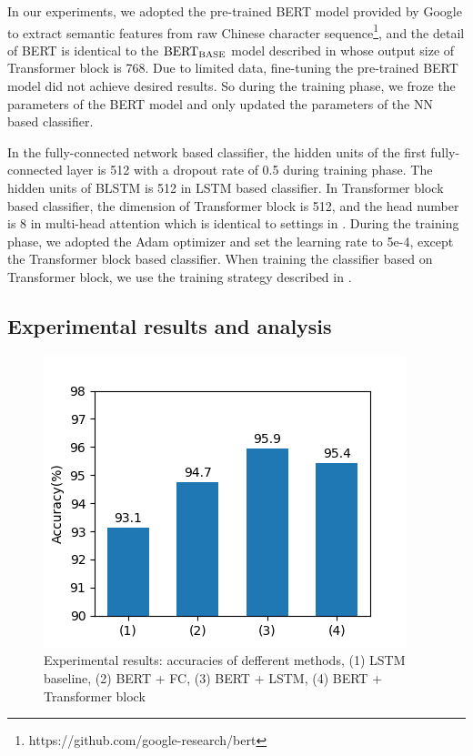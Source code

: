 \documentclass[a4paper]{article}
\begin{document}
In our experiments, we adopted the pre-trained BERT model provided by Google to extract semantic features from raw Chinese character sequence\footnote{https://github.com/google-research/bert}, and the detail of BERT is identical to the $\rm BERT_{BASE}$ model described in \cite{devlin2018bert} whose output size of Transformer block is 768. Due to limited data, fine-tuning the pre-trained BERT model did not achieve desired results. So during the training phase, we froze the parameters of the BERT model and only updated the parameters of the NN based classifier.

In the fully-connected network based classifier, the hidden units of the first fully-connected layer is 512 with a dropout rate of 0.5 during training phase. The hidden units of BLSTM is  512 in LSTM based classifier. In Transformer block based classifier, the dimension of Transformer block is 512, and the head number is 8 in multi-head attention which is identical to settings in \cite{vaswani2017attention}. During the training phase, we adopted the Adam\cite{kingma2014adam} optimizer and set the learning rate to 5e-4, except the Transformer block based classifier. When training the classifier based on Transformer block, we use the training strategy described in \cite{vaswani2017attention}.


\subsection{Experimental results and analysis}

\begin{figure}[t]
	\centering
	\includegraphics[scale=0.4]{pics/acc.png}
	\caption{Experimental results: accuracies of defferent methods, (1) LSTM baseline, (2) BERT + FC, (3) BERT + LSTM, (4) BERT + Transformer block}
	\label{fig:acc}
\end{figure}
\end{document}
